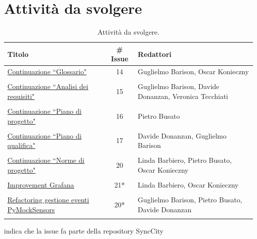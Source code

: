 \documentclass[8pt]{article}
\begin{document}
\section{Attività da svolgere}
\begin{table}[ht!]
	\centering
	\begin{tabular}{p{7cm}cp{7cm}}
		\toprule
		\textbf{Titolo} & \textbf{\# Issue} & \textbf{Redattori} \\
		\midrule
		\href{https://github.com/NaN1fy/docs/issues/14}{\underline{Continuazione ``Glossario"}} & 14 & Guglielmo Barison, Oscar Konieczny\\\\
		\href{https://github.com/NaN1fy/docs/issues/15}{\underline{Continuazione ``Analisi dei
      requisiti"}} & 15 & Guglielmo Barison, Davide Donanzan, Veronica Tecchiati\\\\
		\href{https://github.com/NaN1fy/docs/issues/16}{\underline{Continuazione ``Piano di progetto"}}
      & 16 & Pietro Busato\\\\
		\href{https://github.com/NaN1fy/docs/issues/17}{\underline{Continuazione ``Piano di qualifica"}} & 17 & Davide Donanzan, Guglielmo Barison\\\\
		\href{https://github.com/NaN1fy/docs/issues/20}{\underline{Continuazione ``Norme di progetto"}} & 20 & Linda Barbiero, Pietro Busato, Oscar Konieczny\\\\
        \href{https://github.com/NaN1fy/SyncCity/issues/21}{\underline{Improvement Grafana}} &
        21*\tnote{*} & Linda Barbiero, Oscar Konieczny\\\\
		\href{https://github.com/NaN1fy/SyncCity/issues/20}{\underline{Refactoring gestione eventi
      PyMockSensors}} & 20*\tnote{*} & Guglielmo Barison, Pietro Busato, Davide Donanzan\\\\
		\bottomrule
	\end{tabular}
	\begin{tablenotes}
		\vspace{1em}
		\item * indica che la issue fa parte della repository SyncCity
	\end{tablenotes}
	\caption{Attività da svolgere.}
	\label{table:Attivita da svolgere}
\end{table}
\end{document}
